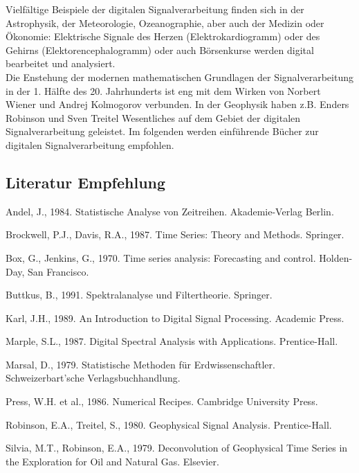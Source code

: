 Vielfältige Beispiele der digitalen Signalverarbeitung finden sich in der Astrophysik, der Meteorologie, Ozeanographie, aber auch der Medizin oder Ökonomie: Elektrische Signale des Herzen (Elektrokardiogramm) oder des Gehirns (Elektorencephalogramm) oder auch Börsenkurse werden digital bearbeitet und analysiert.\\
Die Enstehung der modernen mathematischen Grundlagen der Signalverarbeitung in der 1. Hälfte des 20. Jahrhunderts ist eng mit dem Wirken von Norbert Wiener und Andrej Kolmogorov verbunden. In der Geophysik haben z.B. Enders Robinson und Sven Treitel Wesentliches auf dem Gebiet der digitalen Signalverarbeitung geleistet. Im folgenden werden einführende Bücher zur digitalen Signalverarbeitung empfohlen.

\vspace{0.3cm}

\subsection*{Literatur Empfehlung}

Andel, J., 1984. Statistische Analyse von Zeitreihen. Akademie-Verlag Berlin.

Brockwell, P.J., Davis, R.A., 1987. Time Series: Theory and Methods. Springer.

Box, G.,  Jenkins, G., 1970. Time series analysis: Forecasting and control. Holden-Day, San Francisco.

Buttkus, B., 1991. Spektralanalyse und Filtertheorie. Springer.

Karl, J.H., 1989. An Introduction to Digital Signal Processing. Academic Press.

Marple, S.L., 1987. Digital Spectral Analysis with Applications. Prentice-Hall.

Marsal, D., 1979. Statistische Methoden für Erdwissenschaftler. Schweizerbart’sche Verlagsbuchhandlung.

Press, W.H. et al., 1986. Numerical Recipes. Cambridge University Press.

Robinson, E.A., Treitel, S., 1980. Geophysical Signal Analysis. Prentice-Hall.

Silvia, M.T., Robinson, E.A., 1979. Deconvolution of Geophysical Time Series in the Exploration for Oil and Natural Gas. Elsevier.
  

\vspace{0.3cm}

